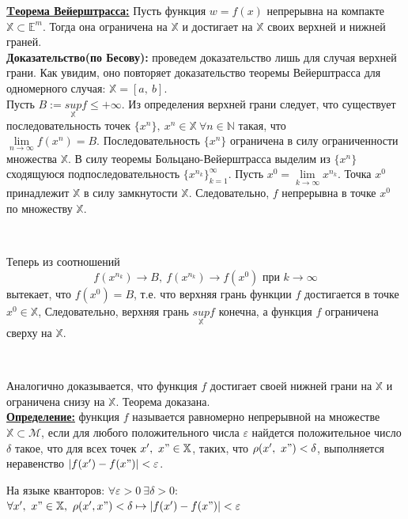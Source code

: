 \documentclass[a4paper,12pt]{article} %
\renewcommand {\leq}{\leqslant}
\begin{document}
\underline{\textbf{Tеорема Вейерштрасса:}} Пусть функция $w = f(x)$ непрерывна на
компакте $\mathbb{X} \subset \mathbb{E}^m.$ Тогда она ограничена на $\mathbb{X}$ и достигает на $\mathbb{X}$
своих верхней и нижней граней.\\

\textbf{Доказательство(по Бесову):} проведем доказательство лишь для случая верхней грани. 
Как увидим, оно повторяет доказательство теоремы Вейерштрасса для одномерного случая: $\mathbb{X} = [a, ~b]$.
\\[2mm]Пусть $B := {\underset{\mathbb{X}}{sup}} f \leq +\infty$. Из определения верхней грани следует, что существует
последовательность точек $\{x^{n}\}, ~x^{n} \in \mathbb{X} ~\forall n \in \mathbb{N}$ такая, что 
\\[2mm]$\lim\limits_{n \to \infty}f(x^{n}) = B$. Последовательность $\{x^{n}\}$ ограничена в силу ограниченности
множества $\mathbb{X}$. В силу теоремы Больцано-Вейерштрасса выделим из $\{x^{n}\}$ сходящуюся подпоследовательность 
${\{x^{n_k}\}}_{k = 1}^\infty$. Пусть $x^{0} = \lim\limits_{k \to \infty} x^{n_k}$. Точка $x^{0}$ принадлежит $\mathbb{X}$
в силу замкнутости $\mathbb{X}$. Следовательно, $f$ непрерывна в точке $x^{0}$ по множеству $\mathbb{X}$.

\

Теперь из соотношений 
$$f(x^{n_k}) \to B, ~ f(x^{n_k}) \to f(x^{0}) \text{ при } k \to \infty$$ вытекает, что $f(x^{0}) = B$, т.е. что верхняя
грань функции $f$ достигается в точке $x^{0} \in \mathbb{X}$, Следовательно, верхняя грань $\underset{\mathbb{X}}{sup}f$ конечна,
а функция $f$ ограничена сверху на $\mathbb{X}$.

\

Аналогично доказывается, что функция $f$ достигает своей нижней грани на $\mathbb{X}$ и ограничена снизу на $\mathbb{X}$. Теорема доказана.\\ 

\underline{\textbf{Определение:}} функция $f$ называется равномерно непрерывной на множестве $\mathbb{X} \subset \mathscr{M}$, 
если для любого положительного числа $\varepsilon$ найдется положительное число $\delta$ такое, что
для всех точек $x', ~ x" \in \mathbb{X}$, таких, что $\rho(x', ~x") < \delta$, выполняется неравенство
$|f(x') - f(x")| < \varepsilon$.

На языке кванторов:
$\forall \varepsilon > 0 ~\exists\delta > 0:$ $\forall x', ~x" \in \mathbb{X}, ~\rho(x', x") < \delta \mapsto |f(x') - f(x")| < \varepsilon$\\
\end{document}
